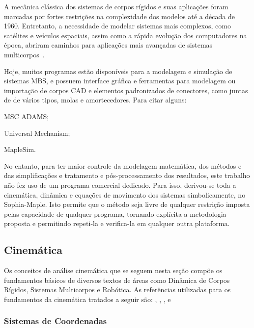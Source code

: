 A mecânica clássica dos sistemas de corpos rígidos e suas aplicações foram
marcadas por fortes restrições na complexidade dos modelos até a década de 1960.
Entretanto, a necessidade de modelar sistemas mais complexos, como satélites e
veículos espaciais, assim como a rápida evolução dos computadores na época,
abriram caminhos para aplicações mais avançadas de sistemas
multicorpos~\cite{schiehlen1997multibody}.

Hoje, muitos programas estão disponíveis para a modelagem e simulação de
sistemas MBS, e possuem interface gráfica e ferramentas para modelagem ou
importação de corpos CAD e elementos padronizados de conectores, como juntas de
de vários tipos, molas e amortecedores. Para citar alguns:
%
\begin{enumerate*}[label=\roman*]
	\item MSC ADAMS;
	\item Universal Mechanism;
	\item MapleSim.
\end{enumerate*}
%

No entanto, para ter maior controle da modelagem matemática, dos métodos e das
simplificações e tratamento e pós-processamento dos resultados, este trabalho
não fez uso de um programa comercial dedicado. Para isso, derivou-se toda a
cinemática, dinâmica e equações de movimento dos sistemas simbolicamente, no
Sophia-Maple. Isto permite que o método seja livre de qualquer restrição imposta
pelas capacidade de qualquer programa, tornando explícita a metodologia proposta
e permitindo repeti-la e verifica-la em qualquer outra plataforma.


\subsection{Cinemática}\label{sec::cinematica}

Os conceitos de análise cinemática que se seguem nesta seção compõe os
fundamentos básicos de diversos textos de áreas como Dinâmica de Corpos Rígidos,
Sistemas Multicorpos e Robótica. As referências utilizadas para os
fundamentos da cinemática tratados a seguir são:
\cite{tenenbaum2006fundamentals},
\cite{kane1985dynamics},
\cite{shabana2013dynamics},
\cite{sciavicco2012modelling} e
\cite{spong2006robot}

\subsubsection{Sistemas de Coordenadas}

